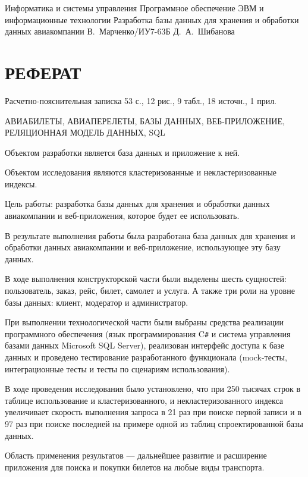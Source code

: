 \documentclass{bmstu}
\begin{document}
\makecourseworktitle
    {Информатика и системы управления}
    {Программное обеспечение ЭВМ и информационные технологии}
    {Разработка базы данных для хранения и обработки данных авиакомпании}
    {В.~Марченко/ИУ7-63Б}
    {Д.~А.~Шибанова}
    {}
    
\setcounter{page}{3}

{\centering \chapter*{РЕФЕРАТ}}

Расчетно-пояснительная записка 53 с., 12 рис., 9 табл., 18 источн., 1 прил.

\noindent АВИАБИЛЕТЫ, АВИАПЕРЕЛЕТЫ, БАЗЫ ДАННЫХ, ВЕБ-ПРИЛОЖЕНИЕ, РЕЛЯЦИОННАЯ МОДЕЛЬ ДАННЫХ, SQL

Объектом разработки является база данных и приложение к ней.

Объектом исследования являются кластеризованные и некластеризованные индексы.

Цель работы: разработка базы данных для хранения и обработки данных авиакомпании и веб-приложения, которое будет ее использовать.

В результате выполнения работы была разработана база данных для хранения и обработки данных авиакомпании и веб-приложение, использующее эту базу данных.

В ходе выполнения конструкторской части были выделены шесть сущностей: пользователь, заказ, рейс, билет, самолет и услуга. 
А также три роли на уровне базы данных: клиент, модератор и администратор.

При выполнении технологической части были выбраны средства реализации программного обеспечения (язык программирования C\texttt{\#} и система управления базами данных Microsoft SQL Server), реализован интерфейс доступа к базе данных и проведено тестирование разработанного функционала (mock-тесты, интеграционные тесты и тесты по сценариям использования).

В ходе проведения исследования было установлено, что при 250 тысячах строк в таблице использование и кластеризованного, и некластеризованного индекса увеличивает скорость выполнения запроса в 21 раз при поиске первой записи и в 97 раз при поиске последней на примере одной из таблиц спроектированной базы данных.

Область применения результатов --- дальнейшее развитие и расширение приложения для поиска и покупки билетов на любые виды транспорта.

{\centering \maketableofcontents}
\end{document}
